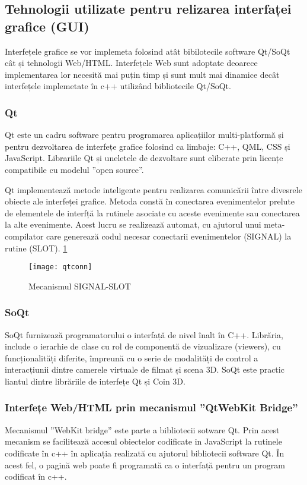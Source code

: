 \subsection{Tehnologii utilizate pentru relizarea interfaței grafice (GUI)}
\par Interfețele grafice se vor implemeta folosind atât bibilotecile software Qt/SoQt cât și tehnologii Web/HTML. Interfețele Web sunt adoptate deoarece implementarea lor necesită mai puțin timp și sunt mult mai dinamice decât interfețele implemetate în c++ utilizând bibliotecile Qt/SoQt.

\subsubsection{Qt}

\par Qt este un cadru software pentru programarea aplicațiilor multi-platformă și pentru dezvoltarea de interfețe grafice folosind  ca limbaje: C++, QML, CSS și JavaScript. Librariile Qt și uneletele de dezvoltare sunt eliberate prin licențe compatibile cu modelul ”open source”. 
\par Qt implementează metode inteligente pentru realizarea comunicării între divesrele obiecte ale interfeței grafice. Metoda constă în conectarea evenimentelor prelute de elementele de interfță la rutinele asociate cu aceste evenimente sau conectarea la alte evenimente. Acest lucru se realizează automat, cu ajutorul unui meta-compilator care generează codul necesar conectarii evenimentelor (SIGNAL) la rutine (SLOT). \ref{fig:sig-slot}

\begin{figure}[h]
    \centering
    \texttt{[image: qtconn]}
    \caption{Mecanismul SIGNAL-SLOT}
    \label{fig:sig-slot}
\end{figure}

\newpage
\subsubsection{SoQt}
\par SoQt furnizează programatorului o interfață de nivel înalt în C++. Librăria, include o ierarhie de clase cu rol de componentă de vizualizare (viewers), cu funcționalități diferite, împreună cu o serie de modalități de control a interacțiunii dintre camerele virtuale de filmat și scena 3D. SoQt este practic liantul dintre librăriile de interfețe Qt și Coin 3D.
\subsubsection{Interfețe Web/HTML prin mecanismul ”QtWebKit Bridge”}
\par Mecanismul ”WebKit bridge” este parte a bibliotecii sotware Qt. Prin acest mecanism se facilitează accesul obiectelor codificate in JavaScript la rutinele codificate în c++ în aplicația realizată cu ajutorul bibliotecii software Qt. În acest fel, o pagină web poate fi programată ca o interfață pentru un program codificat în c++. 
